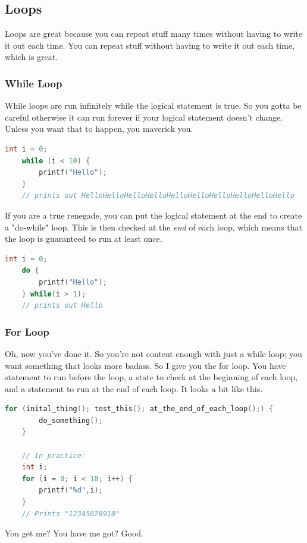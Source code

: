 \subsection{Loops}
Loops are great because you can repeat stuff many times without having to write it out each time. You can repeat stuff without having to write it out each time, which is great.

\subsubsection{While Loop}
While loops are run infinitely while the logical statement is true. So you gotta be careful otherwise it can run forever if your logical statement doesn't change. Unless you want that to happen, you maverick you.
\begin{lstlisting}[language=C]
    int i = 0;
    while (i < 10) {
        printf("Hello");
    }
    // prints out HelloHelloHelloHelloHelloHelloHelloHelloHelloHello
\end{lstlisting}

If you are a true renegade, you can put the logical statement at the end to create a "do-while" loop. This is then checked at the \textit{end} of each loop, which means that the loop is guaranteed to run at least once.
\begin{lstlisting}[language=C]
    int i = 0;
    do {
        printf("Hello");
    } while(i > 1);
    // prints out Hello
\end{lstlisting}

\subsubsection{For Loop}
Oh, now you've done it. So you're not content enough with just a while loop; you want something that looks more badass. So I give you the for loop. You have statement to run before the loop, a state to check at the beginning of each loop, and a statement to run at the end of each loop. It looks a bit like this.
\begin{lstlisting}[language=C]
    for (inital_thing(); test_this(); at_the_end_of_each_loop();) {
        do_something();
    }

    // In practice:
    int i;
    for (i = 0; i < 10; i++) {
        printf("%d",i);
    }
    // Prints "12345678910"
\end{lstlisting}

You get me? You have me got? Good.

